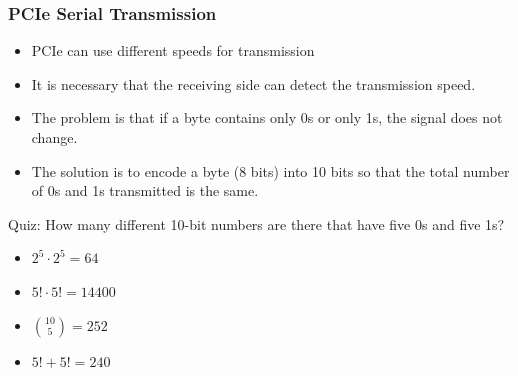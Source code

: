 \documentclass{beamer}
\begin{document}
\begin{frame}
\frametitle{PCIe Serial Transmission}

\begin{itemize}
\item PCIe can use different speeds for transmission
\item It is necessary that the receiving side can detect the transmission speed.
\item The problem is that if a byte contains only 0s or only 1s, the signal does not change.
\item The solution is to encode a byte (8 bits) into 10 bits so that the total number of 0s and 1s transmitted is the same.
\end{itemize}

Quiz: How many different 10-bit numbers are there that have five 0s and five 1s?

\begin{itemize}
\item[A] $2^5 \cdot 2^5 = 64$
\item[B] $5! \cdot 5! = 14400$
\item[C] ${10 \choose 5} = 252$
\item[D] $5! + 5! = 240$
\end{itemize}
\end{frame}
\end{document}
